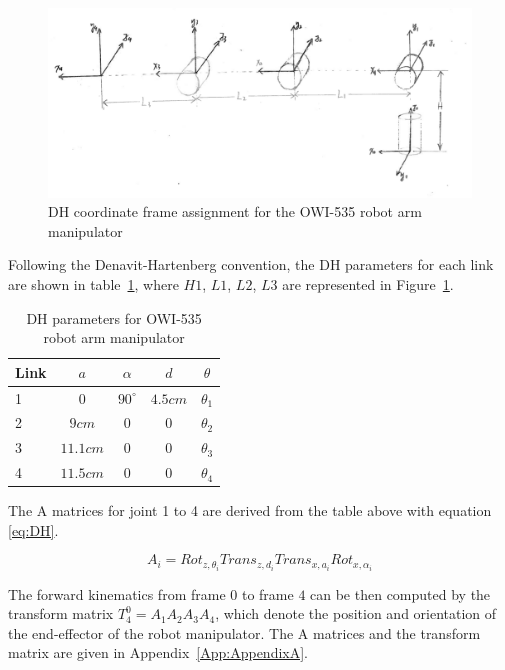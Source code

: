 \documentclass[paper=letter, fontsize=10pt]{scrartcl}	%
\numberwithin{equation}{section}															%
\numberwithin{figure}{section}																%
\numberwithin{table}{section}																%
\begin{document}
\begin{figure}[h!]
  \centering
    \includegraphics[width=1\textwidth]{./Images/frame_assign}
    \caption{DH coordinate frame assignment for the OWI-535 robot arm manipulator}
    \label{fig:frame_assign}
\end{figure}
Following the Denavit-Hartenberg convention, the DH parameters for each link are shown in table~\ref{tab:DH}, where $H1$, $L1$, $L2$, $L3$ are represented in Figure~\ref{fig:frame_assign}.

\begin{table} 
\caption{DH parameters for OWI-535 robot arm manipulator}
\label{tab:DH}
\begin{center}
\begin{tabular}{lcccc}
\toprule
Link & $a$ & $\alpha$ & $d$ & $\theta$\\
\midrule
1 & 0 & $90^\circ$ & $4.5 cm$ & $\theta_1$\\
2 & $9 cm$ & 0 & 0 & $\theta_2$\\
3 & $11.1 cm$ & 0 & 0 & $\theta_3$\\
4 & $11.5 cm$ & 0 & 0 & $\theta_4$\\
\bottomrule
\end{tabular}
\end{center}
\end{table}

The A matrices for joint 1 to 4 are derived from the table above with equation \eqref{eq:DH}.


\begin{equation}\label{eq:DH}
{{A}_{i}}=Ro{{t}_{z,{{\theta }_{i}}}}Tran{{s}_{z,{{d}_{i}}}}Tran{{s}_{x,{{a}_{i}}}}Ro{{t}_{x,{{\alpha }_{i}}}}  
\end{equation}

The forward kinematics from frame $0$ to frame $4$ can be then computed by the transform matrix $T_{4}^{0}={{A}_{1}}{{A}_{2}}{{A}_{3}}{{A}_{4}}$, which denote the position and orientation of the end-effector of the robot manipulator. The A matrices and the transform matrix are given in Appendix~\ref{App:AppendixA}.
\end{document}
